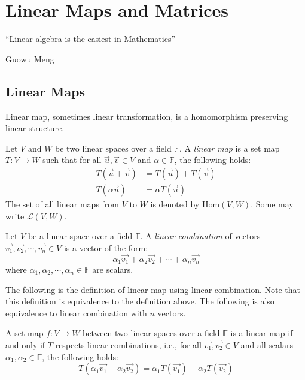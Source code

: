 \documentclass[
	11pt, %
	fleqn, %
	a4paper, %
]{LegrandOrangeBook}
\newcommand{\Hom}[2]{\text{Hom}(#1, #2)} %
\newcommand{\F}{\mathbb{F}} %
\begin{document}

\chapter{Linear Maps and Matrices}

\epigraph{``Linear algebra is the easiest in Mathematics''}{Guowu Meng}

\section{Linear Maps}

Linear map, sometimes linear transformation, is a homomorphism preserving linear structure.

\begin{definition}
    Let $V$ and $W$ be two linear spaces over a field $\F$. A \emph{linear map} is a set map $T: V \to W$ such that for all $\vec{u}, \vec{v} \in V$ and $\alpha \in \F$, the following holds:
    \[
        \begin{split}
            T(\vec{u} + \vec{v}) &= T(\vec{u}) + T(\vec{v}) \\
            T(\alpha \vec{u}) &= \alpha T(\vec{u})
        \end{split}
    \]
    The set of all linear maps from $V$ to $W$ is denoted by $\Hom{V}{W}$. Some may write {$\mathcal{L}(V, W)$}.
\end{definition}

\begin{definition}
    Let $V$ be a linear space over a field $\F$. A \emph{linear combination} of vectors $\vec{v_1}, \vec{v_2}, \cdots, \vec{v_n} \in V$ is a vector of the form:
    \[
        \alpha_1 \vec{v_1} + \alpha_2 \vec{v_2} + \cdots + \alpha_n \vec{v_n}
    \]
    where $\alpha_1, \alpha_2, \cdots, \alpha_n \in \F$ are scalars.
\end{definition}

The following is the definition of linear map using linear combination. Note that this definition is equivalence to the definition above. The following is also equivalence to linear combination with $n$ vectors.

\begin{corollary}
    A set map $f: V \to W$ between two linear spaces over a field $\F$ is a linear map if and only if $T$ respects linear combinations, i.e., for all $\vec{v_1}, \vec{v_2} \in V$ and all scalars $\alpha_1, \alpha_2 \in \F$, the following holds:
    \[
        T(\alpha_1 \vec{v_1} + \alpha_2 \vec{v_2}) = \alpha_1 T(\vec{v_1}) + \alpha_2 T(\vec{v_2})
    \]
\end{corollary}
\end{document}
